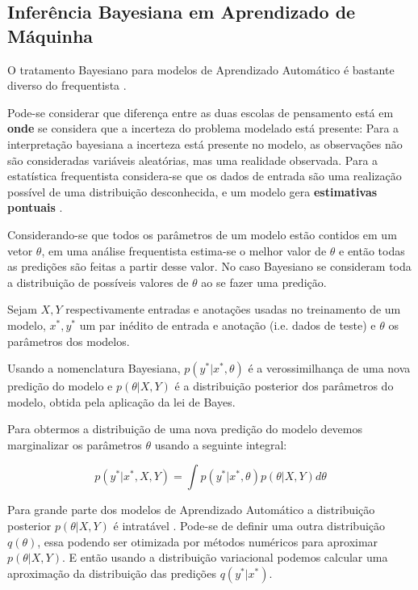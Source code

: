 \subsection{Inferência Bayesiana em Aprendizado de Máquinha}
\label{sec:bayesinf}
O tratamento Bayesiano para modelos de Aprendizado Automático é bastante diverso do frequentista \citep{dlbook}.

Pode-se considerar que diferença entre as duas escolas de pensamento está em
\textbf{onde} se considera que a incerteza do problema modelado está presente: Para a
interpretação bayesiana a incerteza está presente no modelo, as observações não
são consideradas variáveis aleatórias, mas uma realidade observada. Para a estatística frequentista
considera-se que os dados de entrada são uma realização possível de uma
distribuição desconhecida, e um modelo gera \textbf{estimativas pontuais} \citep{rethink}.

Considerando-se que todos os parâmetros de um modelo estão contidos em um vetor
$\theta$, em uma análise frequentista estima-se o melhor valor de $\theta$ e então todas as
predições são feitas a partir desse valor. No caso Bayesiano se consideram toda
a distribuição de possíveis valores de $\theta$ ao se fazer uma predição.

Sejam $X,Y$ respectivamente entradas e anotações usadas no treinamento de um modelo,
$x^*,y^*$ um par inédito de entrada e anotação (i.e. dados de teste) e
$\theta$ os parâmetros dos modelos.

Usando a nomenclatura Bayesiana, $p(y^* | x^*,\theta)$ é a verossimilhança de
uma nova predição do modelo e $p(\theta | X,Y)$ é a distribuição posterior dos
parâmetros do modelo, obtida pela aplicação da lei de Bayes.

Para obtermos a distribuição de uma nova predição do modelo devemos marginalizar os parâmetros $\theta$ usando a seguinte integral:

\begin{equation}
  \label{eq:int}
  p(y^* | x^* , X,Y) = \int  p(y^* | x^*,\theta) p(\theta | X,Y)  d\theta 
\end{equation}

Para grande parte dos modelos de Aprendizado Automático a distribuição posterior
$p(\theta | X,Y)$ é intratável \citep{ubertime}. Pode-se de definir uma outra
distribuição $q(\theta)$, essa podendo ser otimizada por métodos numéricos para
aproximar $p(\theta | X,Y)$. E então usando a distribuição variacional podemos
calcular uma aproximação da distribuição das predições $q(y^*|x^*)$. 

